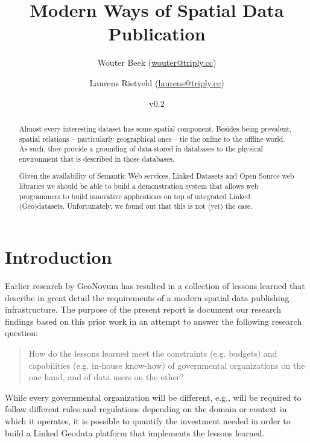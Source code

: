 \documentclass[a4paper]{scrartcl}
\title{Modern Ways of Spatial Data Publication}
\author{Wouter Beek ({\small\url{wouter@triply.cc}})}
\author{Laurens Rietveld ({\small\url{laurens@triply.cc}})}
\affil{Triply ({\small\url{http://triply.cc}})}
\date{v0.2}
\begin{document}
\maketitle

\begin{abstract}
  \noindent Almost every interesting dataset has some spatial
  component.  Besides being prevalent, spatial relations --
  particularly geographical ones -- tie the online to the offline
  world.  As such, they provide a grounding of data stored in
  databases to the physical environment that is described in those
  databases.

  Given the availability of Semantic Web services, Linked Datasets and
  Open Source web libraries we should be able to build a demonstration
  system that allows web programmers to build innovative applications
  on top of integrated Linked (Geo)datasets.  Unfortunately, we found
  out that this is not (yet) the case.
\end{abstract}

\section{Introduction}

Earlier research by GeoNovum has resulted in a collection of lessons
learned that describe in great detail the requirements of a modern
spatial data publishing infrastructure.  The purpose of the present
report is document our research findings based on this prior work in
an attempt to answer the following research question:

\begin{quote}
  How do the lessons learned meet the constraints (e.g. budgets) and
  capabilities (e.g. in-house know-how) of governmental organizations
  on the one hand, and of data users on the other?
\end{quote}

While every governmental organization will be different, e.g., will be
required to follow different rules and regulations depending on the
domain or context in which it operates, it is possible to quantify the
investment needed in order to build a Linked Geodata platform that
implements the lessons learned.
\end{document}
